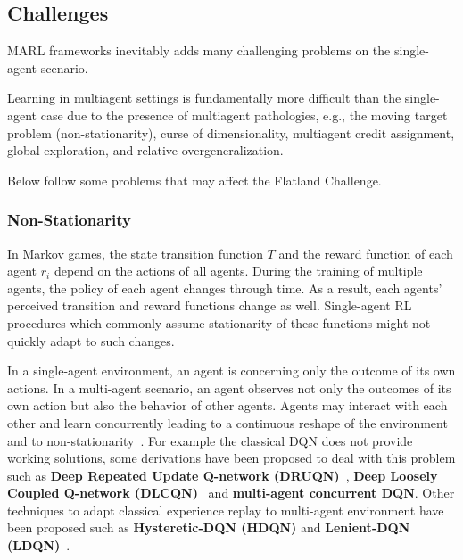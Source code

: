 \documentclass[11pt, a4paper, hidelinks]{report}
\begin{document}
\subsection{Challenges}\label{subsec:challenges}

MARL frameworks inevitably adds many challenging problems on the single-agent scenario.
\begin{quoting}[font=itshape, begintext={"}, endtext={"\citep{Hernandez_Leal_2019}}]
Learning in multiagent settings is fundamentally more difficult than the single-agent case due to the presence of multiagent pathologies, e.g., the moving target problem (non-stationarity), curse of dimensionality, multiagent credit assignment, global exploration, and relative overgeneralization.
\end{quoting}

Below follow some problems that may affect the Flatland Challenge.

\subsubsection{Non-Stationarity}

\begin{quoting}[font=itshape, begintext={"}, endtext={"\citep{papoudakis2019dealing}}]
In Markov games, the state transition function $T$ and the reward function of each agent $r_i$ depend on the actions of all agents.
During the training of multiple agents, the policy of each agent changes through time.
As a result, each agents’ perceived transition and reward functions change as well.
Single-agent RL procedures which commonly assume stationarity of these functions might not quickly adapt to such changes.
\end{quoting}

In a single-agent environment, an agent is concerning only the outcome of its own actions.
In a multi-agent scenario, an agent observes not only the outcomes of its own action but also the behavior of other agents.
Agents may interact with each other and learn concurrently leading to a continuous reshape of the environment and to non-stationarity~\citep{zhang2019multiagent}.
For example the classical DQN does not provide working solutions, some derivations have been proposed to deal with this problem such as \textbf{Deep Repeated Update Q-network (DRUQN)}~\citep{castaneda}, \textbf{Deep Loosely Coupled Q-network (DLCQN)}~\citep{castaneda} and \textbf{ multi-agent concurrent DQN}.
Other techniques to adapt classical experience replay to multi-agent environment have been proposed such as \textbf{Hysteretic-DQN (HDQN)} and \textbf{Lenient-DQN (LDQN)}~\citep{Nguyen_2020}.
\end{document}
